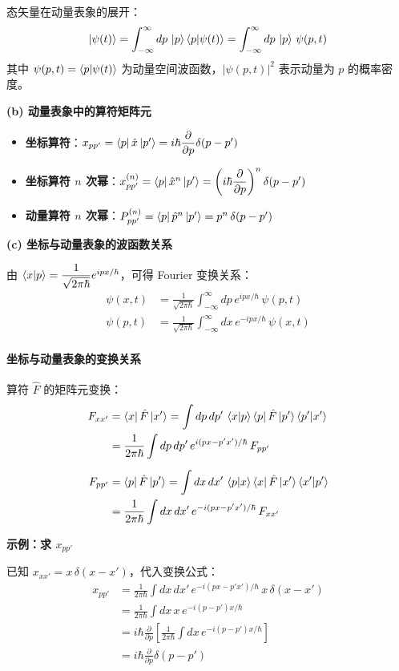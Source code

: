 \documentclass[12pt,a4paper]{article}
\begin{document}
态矢量在动量表象的展开：
\[
\ket{\psi(t)}=\int_{-\infty}^{\infty}dp\,\ket{p}\braket{p|\psi(t)}=\int_{-\infty}^{\infty}dp\,\ket{p}\,\psi(p,t)
\]
其中 $\psi(p,t)=\braket{p|\psi(t)}$ 为动量空间波函数，$|\psi(p,t)|^2$ 表示动量为 $p$ 的概率密度。

\textbf{(b) 动量表象中的算符矩阵元}

\begin{itemize}
    \item \textbf{坐标算符}：$x_{pp'}=\bra{p}\hat{x}\ket{p'}=i\hbar\dfrac{\partial}{\partial p}\delta(p-p')$
    \item \textbf{坐标算符 $n$ 次幂}：$x_{pp'}^{(n)}=\bra{p}\hat{x}^n\ket{p'}=\left(i\hbar\dfrac{\partial}{\partial p}\right)^n\delta(p-p')$
    \item \textbf{动量算符 $n$ 次幂}：$P_{pp'}^{(n)}=\bra{p}\hat{p}^n\ket{p'}=p^n\,\delta(p-p')$
\end{itemize}

\textbf{(c) 坐标与动量表象的波函数关系}

由 $\braket{x|p}=\dfrac{1}{\sqrt{2\pi\hbar}}e^{ipx/\hbar}$，可得 Fourier 变换关系：
\begin{align*}
\psi(x,t)&=\frac{1}{\sqrt{2\pi\hbar}}\int_{-\infty}^{\infty}dp\,e^{ipx/\hbar}\,\psi(p,t)\\
\psi(p,t)&=\frac{1}{\sqrt{2\pi\hbar}}\int_{-\infty}^{\infty}dx\,e^{-ipx/\hbar}\,\psi(x,t)
\end{align*}

\paragraph{坐标与动量表象的变换关系}

算符 $\hat{F}$ 的矩阵元变换：
\begin{align*}
F_{xx'}&=\bra{x}\hat{F}\ket{x'}=\int dp\,dp'\,\braket{x|p}\bra{p}\hat{F}\ket{p'}\braket{p'|x'}\\
&=\frac{1}{2\pi\hbar}\int dp\,dp'\,e^{i(px-p'x')/\hbar}\,F_{pp'}\\[6pt]
F_{pp'}&=\bra{p}\hat{F}\ket{p'}=\int dx\,dx'\,\braket{p|x}\bra{x}\hat{F}\ket{x'}\braket{x'|p'}\\
&=\frac{1}{2\pi\hbar}\int dx\,dx'\,e^{-i(px-p'x')/\hbar}\,F_{xx'}
\end{align*}

\textbf{示例：求 $x_{pp'}$}

已知 $x_{xx'}=x\,\delta(x-x')$，代入变换公式：
\begin{align*}
x_{pp'}&=\frac{1}{2\pi\hbar}\int dx\,dx'\,e^{-i(px-p'x')/\hbar}\,x\,\delta(x-x')\\
&=\frac{1}{2\pi\hbar}\int dx\,x\,e^{-i(p-p')x/\hbar}\\
&=i\hbar\frac{\partial}{\partial p}\left[\frac{1}{2\pi\hbar}\int dx\,e^{-i(p-p')x/\hbar}\right]\\
&=i\hbar\frac{\partial}{\partial p}\delta(p-p')
\end{align*}
\end{document}
